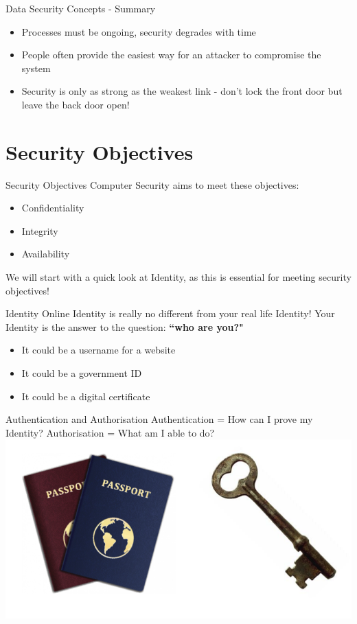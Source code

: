 \documentclass{beamer}
\begin{document}
\begin{frame}{Data Security Concepts - Summary}
\begin{itemize}
\item Processes must be ongoing, security degrades with time
\item People often provide the easiest way for an attacker to compromise the system 
\item Security is only as strong as the weakest link - don't lock the front door but leave the back door open!
\end{itemize}
\end{frame}

\section{Security Objectives}
\frame{\sectionpage}

\begin{frame}{Security Objectives}
Computer Security aims to meet these objectives: 
	\begin{itemize}
		\item Confidentiality
		\item Integrity
        \item Availability
	\end{itemize}
We will start with a quick look at Identity, as this is essential for meeting security objectives!
\end{frame}

\begin{frame}{Identity}
Online Identity is really no different from your real life Identity! 
Your Identity is the answer to the question: \textbf{``who are you?"}
\begin{itemize}
\item It could be a username for a website
\item It could be a government ID
\item It could be a digital certificate
\end{itemize}
\end{frame}

\begin{frame}{Authentication and Authorisation}
Authentication = How can I prove my Identity?
Authorisation = What am I able to do?
\includegraphics[width=1\linewidth]{authn-authz.png}
\end{frame}
\end{document}
